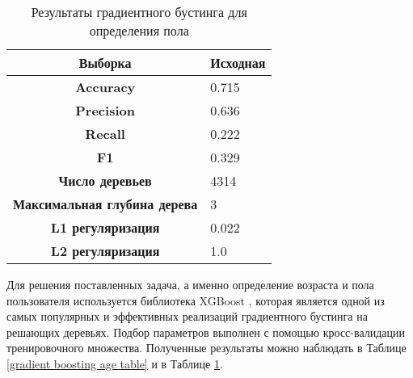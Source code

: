 \begin{table}[h!]
\centering
\begin{tabular}{|c|l|}
\hline
\textbf{Выборка}            & Исходная \\ \hline
\textbf{Accuracy}           & 0.715    \\ \hline
\textbf{Precision}          & 0.636    \\ \hline
\textbf{Recall}             & 0.222    \\ \hline
\textbf{F1}                 & 0.329   \\ \hline
\textbf{Число деревьев}      & 4314     \\ \hline
\textbf{Максимальная глубина дерева}         & 3        \\ \hline
\textbf{L1 регуляризация}         & 0.022    \\ \hline
\textbf{L2 регуляризация}        & 1.0      \\ \hline
\end{tabular}
\caption{Результаты градиентного бустинга для определения пола}
\label{gradient boosting gender table}
\end{table}

Для решения поставленных задача, а именно определение возраста и пола пользователя используется библиотека XGBoost \cite{xgboost}, которая является одной из самых популярных и эффективных реализаций градиентного бустинга на решающих деревьях. Подбор параметров выполнен с помощью кросс-валидации тренировочного множества. Полученные результаты можно наблюдать в Таблице \ref{gradient boosting age table} и в Таблице \ref{gradient boosting gender table}.




\clearpage






